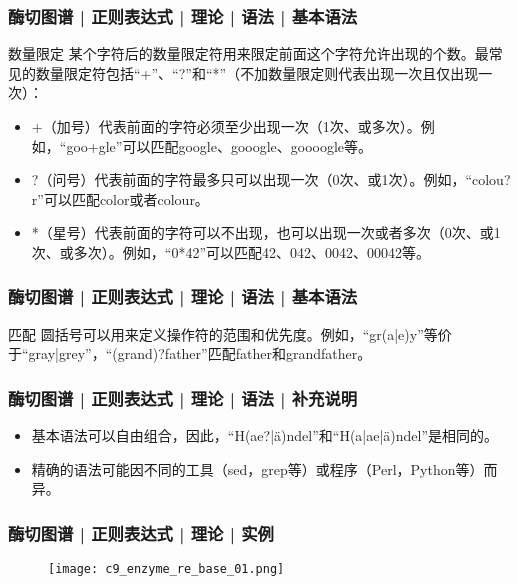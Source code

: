 \begin{frame}
  \frametitle{酶切图谱 | 正则表达式 | 理论 | 语法 | \alert{基本语法}}
  \begin{block}{数量限定}
        某个字符后的数量限定符用来限定前面这个字符允许出现的个数。最常见的数量限定符包括“+”、“?”和“*”（不加数量限定则代表出现一次且仅出现一次）： 
	\begin{itemize}
	  \item +（加号）代表前面的字符必须至少出现一次（1次、或多次）。例如，“goo+gle”可以匹配google、gooogle、goooogle等。
	  \item ?（问号）代表前面的字符最多只可以出现一次（0次、或1次）。例如，“colou?r”可以匹配color或者colour。
	  \item *（星号）代表前面的字符可以不出现，也可以出现一次或者多次（0次、或1次、或多次）。例如，“0*42”可以匹配42、042、0042、00042等。 
	\end{itemize}
  \end{block}
\end{frame}

\begin{frame}
  \frametitle{酶切图谱 | 正则表达式 | 理论 | 语法 | \alert{基本语法}}
  \begin{block}{匹配}
    圆括号可以用来定义操作符的范围和优先度。例如，“gr(a|e)y”等价于“gray|grey”，“(grand)?father”匹配father和grandfather。
  \end{block}
\end{frame}

\begin{frame}
  \frametitle{酶切图谱 | 正则表达式 | 理论 | 语法 | 补充说明}
  \begin{itemize}
    \item 基本语法可以自由组合，因此，“H(ae?|ä)ndel”和“H(a|ae|ä)ndel”是相同的。
    \item 精确的语法可能因不同的工具（sed，grep等）或程序（Perl，Python等）而异。
  \end{itemize}
\end{frame}

\begin{frame}
  \frametitle{酶切图谱 | 正则表达式 | 理论 | 实例}
  \begin{figure}
    \centering
    \texttt{[image: c9\_enzyme\_re\_base\_01.png]}
  \end{figure}
\end{frame}

